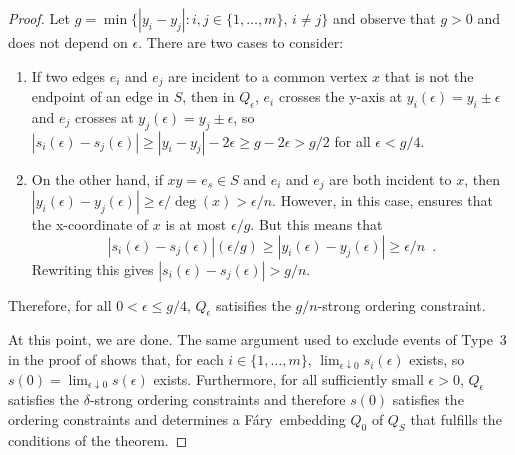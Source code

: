 \documentclass{patmorin}
\newcommand{\Fary}{Fáry}
\begin{document}
\begin{proof}
  Let $g=\min\{|y_i-y_j|: i,j\in\{1,\ldots,m\},\, i\neq j\}$ and observe
  that $g>0$ and does not depend on $\epsilon$.  There are two cases
  to consider:

  \begin{enumerate}
     \item If two edges $e_i$ and $e_j$ are incident to a common
     vertex $x$ that is not the endpoint of an edge in $S$, then
     in $Q_\epsilon$, $e_i$ crosses the y-axis at $y_i(\epsilon) =
     y_i\pm\epsilon$ and $e_j$ crosses at $y_j(\epsilon)=y_j\pm\epsilon$,
     so $|s_i(\epsilon)-s_j(\epsilon)| \ge |y_i-y_j|-2\epsilon \ge
     g-2\epsilon > g/2$ for all $\epsilon < g/4$.

    \item On the other hand, if $xy=e_s\in S$ and $e_i$ and $e_j$
    are both incident to $x$, then $|y_i(\epsilon)-y_j(\epsilon)|
    \ge \epsilon/\deg(x) > \epsilon/n$.  However, in this case,
     ensures that the x-coordinate of $x$ is at
    most $\epsilon/g$.  But this means that
    \[
       |s_i(\epsilon)-s_j(\epsilon)|(\epsilon/g) 
            \ge |y_i(\epsilon)-y_j(\epsilon)| 
            \ge \epsilon/n \enspace .
    \]
    Rewriting this gives $|s_i(\epsilon)-s_j(\epsilon)| > g/n$.  
  \end{enumerate}
  Therefore, for all $0<\epsilon\le g/4$, $Q_\epsilon$ satisifies the
  $g/n$-strong ordering constraint.

  At this point, we are done. The same argument used to exclude events
  of Type~3 in the proof of  shows that, for each
  $i\in\{1,\ldots,m\}$, $\lim_{\epsilon\downarrow 0} s_i(\epsilon)$
  exists, so $s(0)=\lim_{\epsilon\downarrow 0} s(\epsilon)$ exists.
  Furthermore, for all sufficiently small $\epsilon>0$,
  $Q_\epsilon$ satisfies the $\delta$-strong ordering constraints and
  therefore $s(0)$ satisfies the ordering constraints and determines
  a \Fary\ embedding $Q_0$ of $Q_S$ that fulfills the conditions of
  the theorem.
\end{proof}


%
%
%
%
\end{document}
